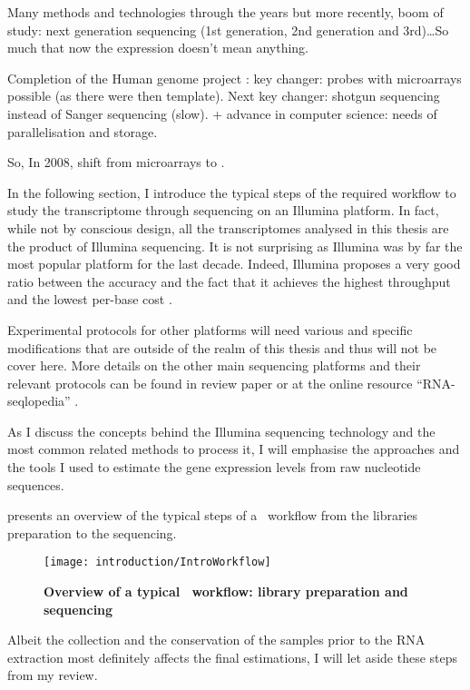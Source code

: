 Many methods and technologies through the years but more recently, boom of study:
next generation sequencing (1st generation, 2nd generation and 3rd)\ldots So
much that now the expression doesn't mean anything.

Completion of the Human genome project : key changer: probes with microarrays
possible (as there were then template). Next key changer: shotgun sequencing
instead of Sanger sequencing (slow). + advance in computer science: needs of
parallelisation and storage.

So, In 2008, shift from microarrays to \Rnaseq.

\clearpage

In the following section, I introduce the typical steps of the required workflow
to study the transcriptome through sequencing on an Illumina platform. In fact,
while not by conscious design, all the transcriptomes analysed in this thesis are
the product of Illumina sequencing. It is not surprising as Illumina was by far
the most popular platform for the last decade. Indeed, Illumina proposes a very
good ratio between the accuracy and the fact that it achieves the highest
throughput and the lowest per-base cost .

Experimental protocols for other platforms will need various and specific
modifications that are outside of the realm of this thesis and thus will not be
cover here. More details on the other main sequencing platforms and their
relevant protocols can be found in \cite{rnaseqProtocols} review paper or at the
online resource ``RNA-seqlopedia'' .

As I discuss the concepts behind the Illumina sequencing technology and the
most common related methods to process it, I will emphasise the approaches and
the tools I used to estimate the gene expression levels from raw nucleotide
sequences.

 presents an overview of the typical steps of a
\Rnaseq\ workflow from the libraries preparation to the sequencing.

\begin{figure}
    \texttt{[image: introduction/IntroWorkflow]}\centering
    \caption[Overview of a \Rnaseq\ workflow: library preparation
    and sequencing]{\label{fig:OverviewRnaseqPrepSeq}\textbf{Overview of
    a typical \Rnaseq\ workflow:
    library preparation and sequencing}}
\end{figure}

\NB Albeit the collection and the conservation of the samples prior to the
\gls{RNA} extraction most definitely affects the final
estimations, I will let aside these steps from my review.


